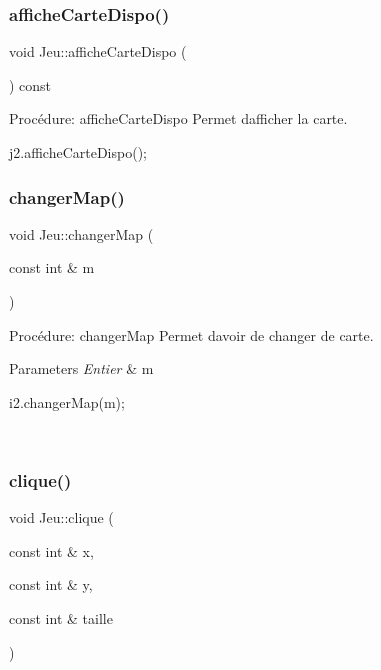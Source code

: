 \subsubsection{\texorpdfstring{affiche\+Carte\+Dispo()}{afficheCarteDispo()}}
{\footnotesize\ttfamily void Jeu\+::affiche\+Carte\+Dispo (\begin{DoxyParamCaption}{ }\end{DoxyParamCaption}) const}



Procédure\+: affiche\+Carte\+Dispo Permet d\textquotesingle{}afficher la carte. 


\begin{DoxyCode}
j2.afficheCarteDispo();
\end{DoxyCode}
 \mbox{\label{classJeu_a87235796c5774f1e75a358a0b62602db}} 
\subsubsection{\texorpdfstring{changer\+Map()}{changerMap()}}
{\footnotesize\ttfamily void Jeu\+::changer\+Map (\begin{DoxyParamCaption}\item[{const int \&}]{m }\end{DoxyParamCaption})}



Procédure\+: changer\+Map Permet d\textquotesingle{}avoir de changer de carte. 


\begin{DoxyParams}{Parameters}
{\em Entier} & m 
\begin{DoxyCode}
i2.changerMap(m);
\end{DoxyCode}
 \\
\hline
\end{DoxyParams}
\mbox{\label{classJeu_a6a95f56b4cdcf94806237e672de41d7f}} 
\subsubsection{\texorpdfstring{clique()}{clique()}}
{\footnotesize\ttfamily void Jeu\+::clique (\begin{DoxyParamCaption}\item[{const int \&}]{x,  }\item[{const int \&}]{y,  }\item[{const int \&}]{taille }\end{DoxyParamCaption})}



